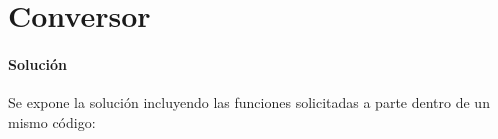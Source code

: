 \section{Conversor}
  
  \paragraph{Solución}
  Se expone la solución incluyendo las funciones
  solicitadas a parte dentro de un mismo código:
  
  